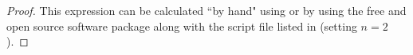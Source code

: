 \begin{proof}
This expression can be calculated ``by hand" using 
or by using the free and open source software package 
along with the script file listed in  (setting $n=2$).
\end{proof}

